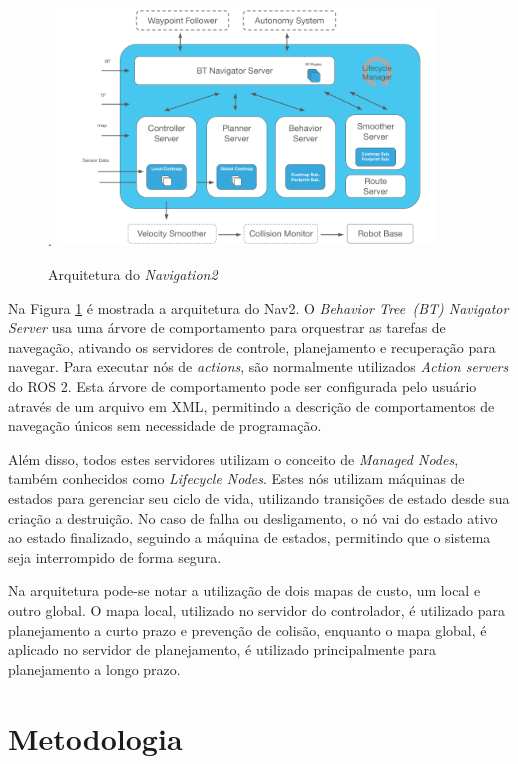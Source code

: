 \documentclass[repeatfields,xlists,xpacks,oneside,yearsonly]{ufrgscca}
\begin{document}
\begin{figure}[htbp]
    {
        \centering
        \caption{Arquitetura do \textit{Navigation2}}.
        \label{fig:nav2_arc}
        \includegraphics[width=0.9\textwidth]{nav2_architecture.png}\\
    }
    {}
\end{figure}

Na Figura \ref{fig:nav2_arc} é mostrada a arquitetura do Nav2.
O \textit{Behavior Tree~(BT) Navigator Server} usa uma árvore de comportamento para
orquestrar as tarefas de navegação, ativando os servidores de controle, planejamento e
recuperação para navegar.
Para executar nós de \textit{actions}, são normalmente utilizados
\textit{Action servers} do ROS 2.
Esta árvore de comportamento pode ser configurada pelo usuário através de um arquivo
em XML, permitindo a descrição de comportamentos de navegação únicos sem
necessidade de programação.

Além disso, todos estes servidores utilizam o conceito de \textit{Managed Nodes},
também conhecidos como \textit{Lifecycle Nodes}.
Estes nós utilizam máquinas de estados para gerenciar seu ciclo de vida, utilizando
transições de estado desde sua criação a destruição.
No caso de falha ou desligamento, o nó vai do estado ativo ao estado finalizado,
seguindo a máquina de estados, permitindo que o sistema seja interrompido
de forma segura.

Na arquitetura pode-se notar a utilização de dois mapas de custo, um local e
outro global.
O mapa local, utilizado no servidor do controlador, é utilizado para planejamento a curto
prazo e prevenção de colisão, enquanto o mapa global, é aplicado no servidor de planejamento, é utilizado principalmente
para planejamento a longo prazo.

\chapter{Metodologia}
\label{desenvolvimento}
\end{document}

